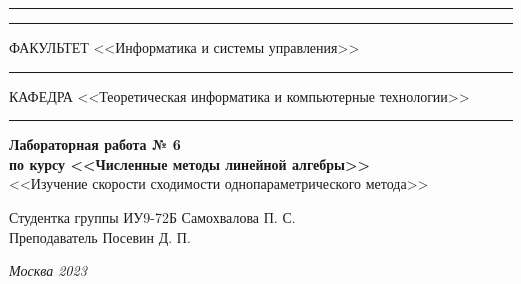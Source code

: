 \documentclass[a4paper, 14pt]{extarticle}
\begin{document}
\begin{titlepage}
\vspace{-25pt}
\hspace{-35pt}\rule{\textwidth}{2.3pt}

\vspace*{-20.3pt}
\hspace{-35pt}\rule{\textwidth}{0.4pt}

\vspace{1.5ex}
\hspace{-35pt} \noindent \small ФАКУЛЬТЕТ\hspace{80pt} <<Информатика и системы управления>>

\vspace*{-16pt}
\hspace{47pt}\rule{0.83\textwidth}{0.4pt}

\vspace{0.5ex}
\hspace{-35pt} \noindent \small КАФЕДРА\hspace{50pt} <<Теоретическая информатика и компьютерные технологии>>

\vspace*{-16pt}
\hspace{30pt}\rule{0.866\textwidth}{0.4pt}
  
\vspace{11em}

\begin{center}
\Large {\bf Лабораторная работа № 6} \\
\large {\bf по курсу <<Численные методы линейной алгебры>>} \\
\large <<Изучение скорости сходимости однопараметрического метода>>
\end{center}\normalsize

\vspace{8em}


\begin{flushright}
  {Студентка группы ИУ9-72Б Самохвалова П. С. \hspace*{15pt}\\
  \vspace{2ex}
  Преподаватель Посевин Д. П.\hspace*{15pt}}
\end{flushright}

\bigskip

\vfill
 

\begin{center}
\textsl{Москва 2023}
\end{center}
\end{titlepage}
\end{document}
